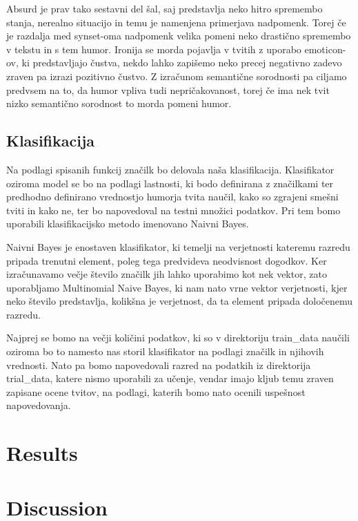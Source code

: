 \documentclass[a4paper]{article}
\begin{document}
Absurd je prav tako sestavni del šal, saj predstavlja neko hitro spremembo stanja, nerealno situacijo in temu je namenjena primerjava nadpomenk. Torej če je razdalja med synset-oma nadpomenk velika pomeni neko drastično spremembo v tekstu in s tem humor. Ironija se morda pojavlja v tvitih z uporabo emoticon-ov, ki predstavljajo čustva, nekdo lahko zapišemo neko precej negativno zadevo zraven pa izrazi pozitivno čustvo. Z izračunom semantične sorodnosti pa ciljamo predvsem na to, da humor vpliva tudi nepričakovanost, torej če ima nek tvit nizko semantično sorodnost to morda pomeni humor.

\subsection{Klasifikacija}

Na podlagi spisanih funkcij značilk bo delovala naša klasifikacija. Klasifikator oziroma model se bo na podlagi lastnosti, ki bodo definirana z značilkami ter predhodno definirano vrednostjo humorja tvita naučil, kako so zgrajeni smešni tviti in kako ne, ter bo napovedoval na testni množici podatkov. Pri tem bomo uporabili klasifikacijsko metodo imenovano Naivni Bayes.

Naivni Bayes je enostaven klasifikator, ki temelji na verjetnosti kateremu razredu pripada trenutni element, poleg tega predvideva neodvisnost dogodkov. Ker izračunavamo večje število značilk jih lahko uporabimo kot nek vektor, zato uporabljamo Multinomial Naive Bayes, ki nam nato vrne vektor verjetnosti, kjer neko število predstavlja, kolikšna je verjetnost, da ta element pripada določenemu razredu.

Najprej se bomo na večji količini podatkov, ki so v direktoriju train\_data naučili oziroma bo to namesto nas storil klasifikator na podlagi značilk in njihovih vrednosti. Nato pa bomo napovedovali razred na podatkih iz direktorija trial\_data, katere nismo uporabili za učenje, vendar imajo kljub temu zraven zapisane ocene tvitov, na podlagi, katerih bomo nato ocenili uspešnost napovedovanja.

\section{Results}



\section{Discussion}
\end{document}
